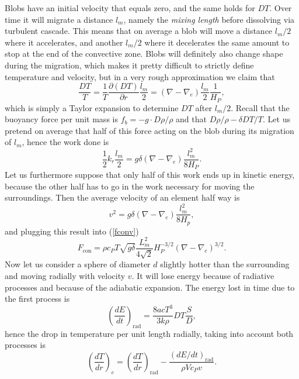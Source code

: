 Blobs have an initial velocity that equals zero, and the same holds for $DT$. Over time it will migrate a distance $l_m$, namely the \textit{mixing length} before dissolving via turbulent cascade. This means that on average a blob will move a distance $l_m/2$ where it accelerates, and another $l_m/2$ where it decelerates the same amount to stop at the end of the convective zone. Blobs will definitely also change shape during the migration, which makes it pretty difficult to strictly define temperature and velocity, but in a very rough approximation we claim that
\begin{equation}
	\frac{DT}{T}=\frac{1}{T}\frac{\partial (DT)}{\partial r} \frac{l_m}{2}=(\nabla-\nabla_e)\frac{l_m}{2}\frac{1}{H_P},
\end{equation}
which is simply a Taylor expansion to determine $DT$ after $l_m/2$. Recall that the buoyancy force per unit mass is $f_b=-g \cdot D \rho / \rho$ and that $D \rho / \rho - \delta D T / T$. Let us pretend on average that half of this force acting on the blob during its migration of $l_m$, hence the work done is
\begin{equation}\label{7.6}
	\frac{1}{2} k_r \frac{l_m}{2}=g \delta (\nabla - \nabla_e)\frac{l_m^2}{8 H_P}.
\end{equation}
Let us furthermore suppose that only half of this work ends up in kinetic energy, because the other half has to go in the work necessary for moving the surroundings. Then the average velocity of an element half way is
\begin{equation}
	v^2=g \delta (\nabla - \nabla_e)\frac{l_m^2}{8 H_p},
\end{equation}
and plugging this result into (\ref{fconv})
\begin{equation}
F_{\mathrm{con}}= \rho c_P T \sqrt{g \delta} \frac{L^2_m}{4\sqrt{2}}H_P^{-3/2} (\nabla-\nabla_e)^{3/2}.
\end{equation}
Now let us consider a sphere of diameter $d$ slightly hotter than the surrounding and moving radially with velocity $v$. It will lose energy because of radiative processes and because of the adiabatic expansion. The energy lost in time due to the first process is
\begin{equation}
\left (\frac{d E}{d t}  \right )_{\mathrm{rad}} = \frac{8 a c T^3}{3 k \rho} DT \frac{S}{D},
\end{equation}
hence the drop in temperature per unit length radially, taking into account both processes is
\begin{equation}\label{7.7}
	\left (  \frac{d T}{d r }   \right )_e = \left(  \frac{dT}{d r }   \right )_{\mathrm{rad}} - \frac{\left( d E / dt \right)_{\mathrm{rad}} }{\rho V c_P v}.
\end{equation}
